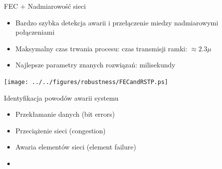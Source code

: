 \documentclass[compress,red]{beamer}
\begin{document}
\begin{frame}{FEC + Nadmiarowość sieci}

  \begin{itemize}
    \item Bardzo szybka detekcja awarii i przełączenie miedzy nadmiarowymi połączeniami
    \item Maksymalny czas trwania procesu: czas transmisji ramki: $\approx 2.3 \mu$
    \item Najlepsze parametry znanych rozwiązań: milisekundy
  \end{itemize}

      \begin{center}
      \texttt{[image: ../../figures/robustness/FECandRSTP.ps]}
      \end{center}


\end{frame}
\begin{frame}{Identyfikacja powodów awarii systemu}


  \begin{itemize}
    \item Przekłamanie danych (bit errors)
    \item Przeciążenie sieci (congestion)
    \item Awaria elementów sieci (element failure)
    \item {}
  \end{itemize}

\end{frame}
\end{document}
